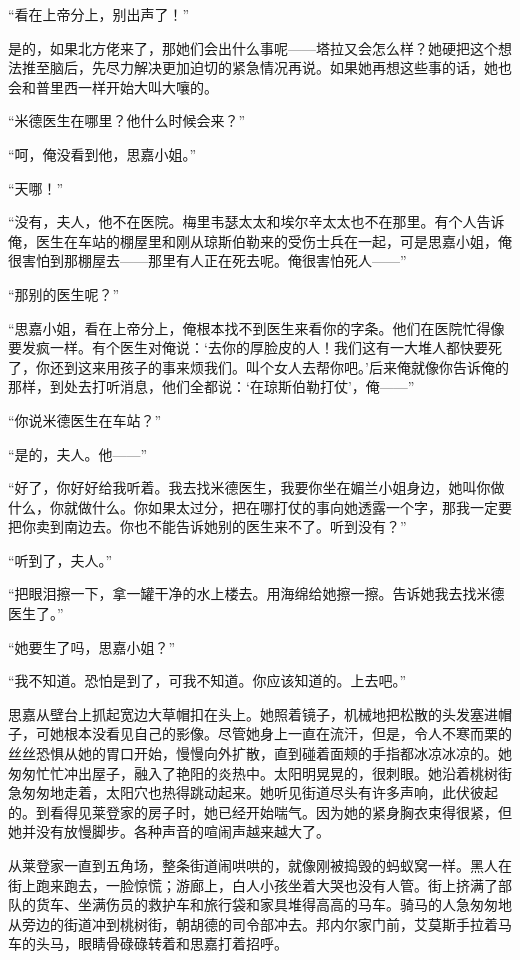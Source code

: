 \par “看在上帝分上，别出声了！”
\par 是的，如果北方佬来了，那她们会出什么事呢——塔拉又会怎么样？她硬把这个想法推至脑后，先尽力解决更加迫切的紧急情况再说。如果她再想这些事的话，她也会和普里西一样开始大叫大嚷的。
\par “米德医生在哪里？他什么时候会来？”
\par “呵，俺没看到他，思嘉小姐。”
\par “天哪！”
\par “没有，夫人，他不在医院。梅里韦瑟太太和埃尔辛太太也不在那里。有个人告诉俺，医生在车站的棚屋里和刚从琼斯伯勒来的受伤士兵在一起，可是思嘉小姐，俺很害怕到那棚屋去——那里有人正在死去呢。俺很害怕死人——”
\par “那别的医生呢？”
\par “思嘉小姐，看在上帝分上，俺根本找不到医生来看你的字条。他们在医院忙得像要发疯一样。有个医生对俺说：‘去你的厚脸皮的人！我们这有一大堆人都快要死了，你还到这来用孩子的事来烦我们。叫个女人去帮你吧。’后来俺就像你告诉俺的那样，到处去打听消息，他们全都说：‘在琼斯伯勒打仗’，俺——”
\par “你说米德医生在车站？”
\par “是的，夫人。他——”
\par “好了，你好好给我听着。我去找米德医生，我要你坐在媚兰小姐身边，她叫你做什么，你就做什么。你如果太过分，把在哪打仗的事向她透露一个字，那我一定要把你卖到南边去。你也不能告诉她别的医生来不了。听到没有？”
\par “听到了，夫人。”
\par “把眼泪擦一下，拿一罐干净的水上楼去。用海绵给她擦一擦。告诉她我去找米德医生了。”
\par “她要生了吗，思嘉小姐？”
\par “我不知道。恐怕是到了，可我不知道。你应该知道的。上去吧。”
\par 思嘉从壁台上抓起宽边大草帽扣在头上。她照着镜子，机械地把松散的头发塞进帽子，可她根本没看见自己的影像。尽管她身上一直在流汗，但是，令人不寒而栗的丝丝恐惧从她的胃口开始，慢慢向外扩散，直到碰着面颊的手指都冰凉冰凉的。她匆匆忙忙冲出屋子，融入了艳阳的炎热中。太阳明晃晃的，很刺眼。她沿着桃树街急匆匆地走着，太阳穴也热得跳动起来。她听见街道尽头有许多声响，此伏彼起的。到看得见莱登家的房子时，她已经开始喘气。因为她的紧身胸衣束得很紧，但她并没有放慢脚步。各种声音的喧闹声越来越大了。
\par 从莱登家一直到五角场，整条街道闹哄哄的，就像刚被捣毁的蚂蚁窝一样。黑人在街上跑来跑去，一脸惊慌；游廊上，白人小孩坐着大哭也没有人管。街上挤满了部队的货车、坐满伤员的救护车和旅行袋和家具堆得高高的马车。骑马的人急匆匆地从旁边的街道冲到桃树街，朝胡德的司令部冲去。邦内尔家门前，艾莫斯手拉着马车的头马，眼睛骨碌碌转着和思嘉打着招呼。
